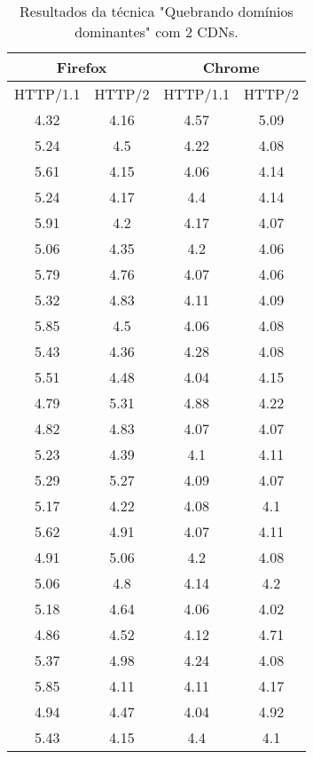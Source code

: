 \begin{table}[H]
	\centering
	\caption{Resultados da técnica "Quebrando domínios dominantes" com 2 CDNs.}
	\label{resultados-quebrandodominiosdominantes-2}
	\begin{tabular}{cccc}
		\hline
		\multicolumn{2}{c}{\textbf{Firefox}} & \multicolumn{2}{c}{\textbf{Chrome}} \\
		\hline
		HTTP/1.1 & HTTP/2 & HTTP/1.1 & HTTP/2 \\
		\hline
		4.32 & 4.16 & 4.57 & 5.09 \\
		5.24 & 4.5 & 4.22 & 4.08 \\
		5.61 & 4.15 & 4.06 & 4.14 \\
		5.24 & 4.17 & 4.4 & 4.14 \\
		5.91 & 4.2 & 4.17 & 4.07 \\
		5.06 & 4.35 & 4.2 & 4.06 \\
		5.79 & 4.76 & 4.07 & 4.06 \\
		5.32 & 4.83 & 4.11 & 4.09 \\
		5.85 & 4.5 & 4.06 & 4.08 \\
		5.43 & 4.36 & 4.28 & 4.08 \\
		5.51 & 4.48 & 4.04 & 4.15 \\
		4.79 & 5.31 & 4.88 & 4.22 \\
		4.82 & 4.83 & 4.07 & 4.07 \\
		5.23 & 4.39 & 4.1 & 4.11 \\
		5.29 & 5.27 & 4.09 & 4.07 \\
		5.17 & 4.22 & 4.08 & 4.1 \\
		5.62 & 4.91 & 4.07 & 4.11 \\
		4.91 & 5.06 & 4.2 & 4.08 \\
		5.06 & 4.8 & 4.14 & 4.2 \\
		5.18 & 4.64 & 4.06 & 4.02 \\
		4.86 & 4.52 & 4.12 & 4.71 \\
		5.37 & 4.98 & 4.24 & 4.08 \\
		5.85 & 4.11 & 4.11 & 4.17 \\
		4.94 & 4.47 & 4.04 & 4.92 \\
		5.43 & 4.15 & 4.4 & 4.1 \\
		\hline
	\end{tabular}
\end{table}